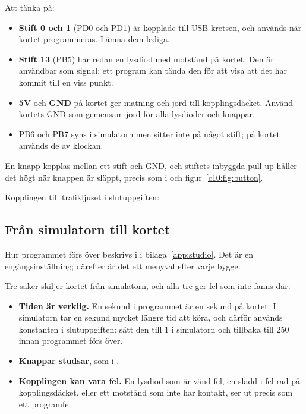 
\noindent Att tänka på:
\begin{itemize}
  \item \textbf{Stift 0 och 1} (PD0 och PD1) är kopplade till USB-kretsen, och används när kortet
    programmeras. Lämna dem lediga.
  \item \textbf{Stift 13} (PB5) har redan en lysdiod med motstånd på kortet. Den är användbar som
    signal: ett program kan tända den för att visa att det har kommit till en viss punkt.
  \item \textbf{5V} och \textbf{GND} på kortet ger matning och jord till kopplingsdäcket. Använd
    kortets GND som gemensam jord för alla lysdioder och knappar.
  \item PB6 och PB7 syns i simulatorn men sitter inte på något stift; på kortet används de av
    klockan.
\end{itemize}

En knapp kopplas mellan ett stift och GND, och stiftets inbyggda pull-up håller det högt när
knappen är släppt, precis som i  och figur~\ref{c10:fig:button}.

Kopplingen till trafikljuset i slutuppgiften:


\subsection{Från simulatorn till kortet}
\label{c11:a6}
Hur programmet förs över beskrivs i  i bilaga~\ref{app:studio}. Det är en
engångsinställning; därefter är det ett menyval efter varje bygge.

Tre saker skiljer kortet från simulatorn, och alla tre ger fel som inte fanns där:
\begin{itemize}
  \item \textbf{Tiden är verklig.} En sekund i programmet är en sekund på kortet. I simulatorn tar
    en sekund mycket längre tid att köra, och därför används konstanten  i
    slutuppgiften: sätt den till 1 i simulatorn och tillbaka till 250 innan programmet förs över.
  \item \textbf{Knappar studsar}, som i .
  \item \textbf{Kopplingen kan vara fel.} En lysdiod som är vänd fel, en sladd i fel rad på
    kopplingsdäcket, eller ett motstånd som inte har kontakt, ser ut precis som ett programfel.
\end{itemize}

